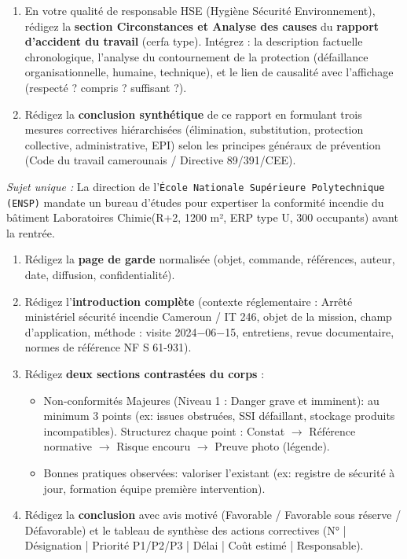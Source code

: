 \documentclass[11pt]{article}
\begin{document}
\begin{exercice}
\begin{enumerate}
        \item En votre qualité de responsable HSE (Hygiène Sécurité Environnement), rédigez la \textbf{section \og Circonstances et Analyse des causes\fg} du \textbf{rapport d'accident du travail} (cerfa type). Intégrez : la description factuelle chronologique, l'analyse du contournement de la protection (défaillance organisationnelle, humaine, technique), et le lien de causalité avec l'affichage (respecté ? compris ? suffisant ?).
        \item Rédigez la \textbf{conclusion synthétique} de ce rapport en formulant trois mesures correctives hiérarchisées (élimination, substitution, protection collective, administrative, EPI) selon les principes généraux de prévention (Code du travail camerounais / Directive 89/391/CEE).
    \end{enumerate}
\end{exercice}

\begin{exercice}
    \textit{Sujet unique :} La direction de l'\texttt{École Nationale Supérieure Polytechnique (ENSP)} mandate un bureau d'études pour expertiser la conformité incendie du bâtiment \og Laboratoires Chimie\fg (R+2, 1200 m², ERP type U, 300 occupants) avant la rentrée.
    \begin{enumerate}
        \item Rédigez la \textbf{page de garde} normalisée (objet, commande, références, auteur, date, diffusion, confidentialité).
        \item Rédigez l'\textbf{introduction complète} (contexte réglementaire : Arrêté ministériel sécurité incendie Cameroun / IT 246, objet de la mission, champ d'application, méthode : visite \SI{2024-06-15}{}, entretiens, revue documentaire, normes de référence NF S 61-931).
        \item Rédigez \textbf{deux sections contrastées du corps} :
              \begin{itemize}
                  \item {} Non-conformités Majeures (Niveau 1 : Danger grave et imminent)\fg : au minimum 3 points (ex: issues obstruées, SSI défaillant, stockage produits incompatibles). Structurez chaque point : Constat $\rightarrow$ Référence normative $\rightarrow$ Risque encouru $\rightarrow$ Preuve photo (légende).
                  \item {} Bonnes pratiques observées\fg : valoriser l'existant (ex: registre de sécurité à jour, formation équipe première intervention).
              \end{itemize}
        \item Rédigez la \textbf{conclusion} avec avis motivé (Favorable / Favorable sous réserve / Défavorable) et le tableau de synthèse des actions correctives (N° | Désignation | Priorité P1/P2/P3 | Délai | Coût estimé | Responsable).
    \end{enumerate}
\end{exercice}
\end{document}
